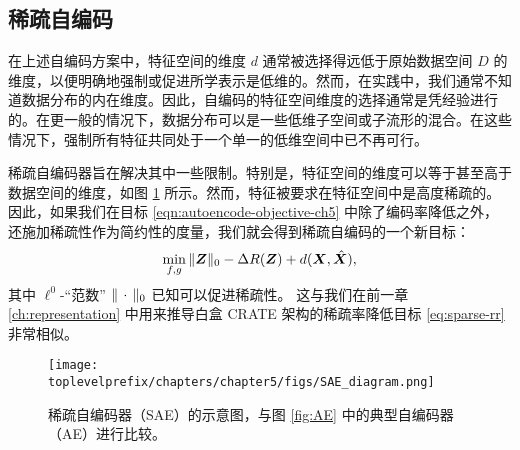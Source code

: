 \documentclass[../../book-main_zh.tex]{subfiles}
\begin{document}
\subsection{稀疏自编码}
在上述自编码方案中，特征空间的维度 $d$ 通常被选择得远低于原始数据空间 $D$ 的维度，以便明确地强制或促进所学表示是低维的。然而，在实践中，我们通常不知道数据分布的内在维度。因此，自编码的特征空间维度的选择通常是凭经验进行的。在更一般的情况下，数据分布可以是一些低维子空间或子流形的混合。在这些情况下，强制所有特征共同处于一个单一的低维空间中已不再可行。

稀疏自编码器旨在解决其中一些限制。特别是，特征空间的维度可以等于甚至高于数据空间的维度，如图 \ref{fig:SAE} 所示。然而，特征被要求在特征空间中是高度稀疏的。因此，如果我们在目标 \eqref{eqn:autoencode-objective-ch5} 中除了编码率降低之外，还施加稀疏性作为简约性的度量，我们就会得到稀疏自编码的一个新目标：
\begin{equation}
  \min_{f, g}
  \|\bm{Z}\|_0 - \Delta R(\bm{Z}) + d(\bm{X}, \hat {\bm{X}}),
  \label{eqn:autoencode-sparse}
\end{equation}
其中 $\ell^0$-“范数” $\|\,\cdot\,\|_0$ 已知可以促进稀疏性。
这与我们在前一章 \ref{ch:representation} 中用来推导白盒 CRATE 架构的稀疏率降低目标 \eqref{eq:sparse-rr} 非常相似。

\begin{figure}
  \centering
  \texttt{[image: \\toplevelprefix/chapters/chapter5/figs/SAE\_diagram.png]}
  \caption{稀疏自编码器（SAE）的示意图，与图 \ref{fig:AE} 中的典型自编码器（AE）进行比较。}
  \label{fig:SAE}
\end{figure}

\end{document}
